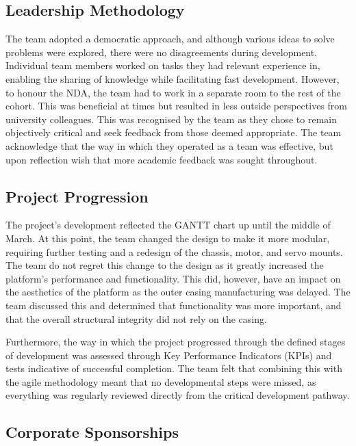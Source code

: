 \documentclass [12pt]{article}
\begin{document}
\subsection{Leadership Methodology}
The team adopted a democratic approach, and although various ideas to solve problems were explored, there were no disagreements during development. Individual team members worked on tasks they had relevant experience in, enabling the sharing of knowledge while facilitating fast development. However, to honour the NDA, the team had to work in a separate room to the rest of the cohort. This was beneficial at times but resulted in less outside perspectives from university colleagues. This was recognised by the team as they chose to remain objectively critical and seek feedback from those deemed appropriate. The team acknowledge that the way in which they operated as a team was effective, but upon reflection wish that more academic feedback was sought throughout. 

\subsection{Project Progression}
The project’s development reflected the GANTT chart up until the middle of March. At this point, the team changed the design to make it more modular, requiring further testing and a redesign of the chassis, motor, and servo mounts. The team do not regret this change to the design as it greatly increased the platform’s performance and functionality. This did, however, have an impact on the aesthetics of the platform as the outer casing manufacturing was delayed.  The team discussed this and determined that functionality was more important, and that the overall structural integrity did not rely on the casing.  

Furthermore, the way in which the project progressed through the defined stages of development was assessed through Key Performance Indicators (KPIs) and tests indicative of successful completion. The team felt that combining this with the agile methodology meant that no developmental steps were missed, as everything was regularly reviewed directly from the critical development pathway.  

\subsection{Corporate Sponsorships}
\end{document}
